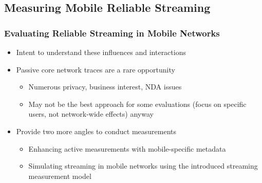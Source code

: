 \documentclass{beamer}
\begin{document}
\subsection{Measuring Mobile Reliable Streaming}

\begin{frame}
	\frametitle{Evaluating Reliable Streaming in Mobile Networks}

	\begin{itemize}
		\item Intent to understand these influences and interactions
		\item Passive core network traces are a rare opportunity
		\begin{itemize}
			\item Numerous privacy, business interest, NDA issues
			\item May not be the best approach for some evaluations (focus on specific users, not network-wide effects) anyway
		\end{itemize}
		\item Provide two more angles to conduct measurements
		\begin{itemize}
			\item Enhancing active measurements with mobile-specific metadata
			\item Simulating streaming in mobile networks using the introduced streaming measurement model
		\end{itemize}
	\end{itemize}
\end{frame}
\end{document}

